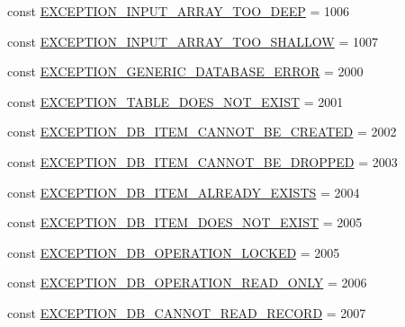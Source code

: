 \begin{DoxyCompactItemize}
\item 
const \hyperlink{class_database_exception_model_a86c756dcdcdc0d6a13363e420b4b1ed6}{E\+X\+C\+E\+P\+T\+I\+O\+N\+\_\+\+I\+N\+P\+U\+T\+\_\+\+A\+R\+R\+A\+Y\+\_\+\+T\+O\+O\+\_\+\+D\+E\+E\+P} = 1006
\item 
const \hyperlink{class_database_exception_model_ab8d6e239e0336ea8b8e1203f6c38f3c7}{E\+X\+C\+E\+P\+T\+I\+O\+N\+\_\+\+I\+N\+P\+U\+T\+\_\+\+A\+R\+R\+A\+Y\+\_\+\+T\+O\+O\+\_\+\+S\+H\+A\+L\+L\+O\+W} = 1007
\item 
const \hyperlink{class_database_exception_model_a54384c002df87b714c8cd0d27db21f85}{E\+X\+C\+E\+P\+T\+I\+O\+N\+\_\+\+G\+E\+N\+E\+R\+I\+C\+\_\+\+D\+A\+T\+A\+B\+A\+S\+E\+\_\+\+E\+R\+R\+O\+R} = 2000
\item 
const \hyperlink{class_database_exception_model_a8c1f734137128a0b3a7ab767e583e7ad}{E\+X\+C\+E\+P\+T\+I\+O\+N\+\_\+\+T\+A\+B\+L\+E\+\_\+\+D\+O\+E\+S\+\_\+\+N\+O\+T\+\_\+\+E\+X\+I\+S\+T} = 2001
\item 
const \hyperlink{class_database_exception_model_ae8c6c4d6c53676f4dfc17c3acbc4e86a}{E\+X\+C\+E\+P\+T\+I\+O\+N\+\_\+\+D\+B\+\_\+\+I\+T\+E\+M\+\_\+\+C\+A\+N\+N\+O\+T\+\_\+\+B\+E\+\_\+\+C\+R\+E\+A\+T\+E\+D} = 2002
\item 
const \hyperlink{class_database_exception_model_a0d11e2b4e48912224166b8733bf7cee8}{E\+X\+C\+E\+P\+T\+I\+O\+N\+\_\+\+D\+B\+\_\+\+I\+T\+E\+M\+\_\+\+C\+A\+N\+N\+O\+T\+\_\+\+B\+E\+\_\+\+D\+R\+O\+P\+P\+E\+D} = 2003
\item 
const \hyperlink{class_database_exception_model_a3adbce979bbf4f1f99b59bb62555307f}{E\+X\+C\+E\+P\+T\+I\+O\+N\+\_\+\+D\+B\+\_\+\+I\+T\+E\+M\+\_\+\+A\+L\+R\+E\+A\+D\+Y\+\_\+\+E\+X\+I\+S\+T\+S} = 2004
\item 
const \hyperlink{class_database_exception_model_a051a953b3dbf5c69685ae0905d68a2cb}{E\+X\+C\+E\+P\+T\+I\+O\+N\+\_\+\+D\+B\+\_\+\+I\+T\+E\+M\+\_\+\+D\+O\+E\+S\+\_\+\+N\+O\+T\+\_\+\+E\+X\+I\+S\+T} = 2005
\item 
const \hyperlink{class_database_exception_model_aafe8d0c8826d17ec598136f35e381524}{E\+X\+C\+E\+P\+T\+I\+O\+N\+\_\+\+D\+B\+\_\+\+O\+P\+E\+R\+A\+T\+I\+O\+N\+\_\+\+L\+O\+C\+K\+E\+D} = 2005
\item 
const \hyperlink{class_database_exception_model_a314fb08476b7cab00496a16cfa30708f}{E\+X\+C\+E\+P\+T\+I\+O\+N\+\_\+\+D\+B\+\_\+\+O\+P\+E\+R\+A\+T\+I\+O\+N\+\_\+\+R\+E\+A\+D\+\_\+\+O\+N\+L\+Y} = 2006
\item 
const \hyperlink{class_database_exception_model_af4c8c1347d3322d171c556f518fb75a6}{E\+X\+C\+E\+P\+T\+I\+O\+N\+\_\+\+D\+B\+\_\+\+C\+A\+N\+N\+O\+T\+\_\+\+R\+E\+A\+D\+\_\+\+R\+E\+C\+O\+R\+D} = 2007

\end{DoxyCompactItemize}
